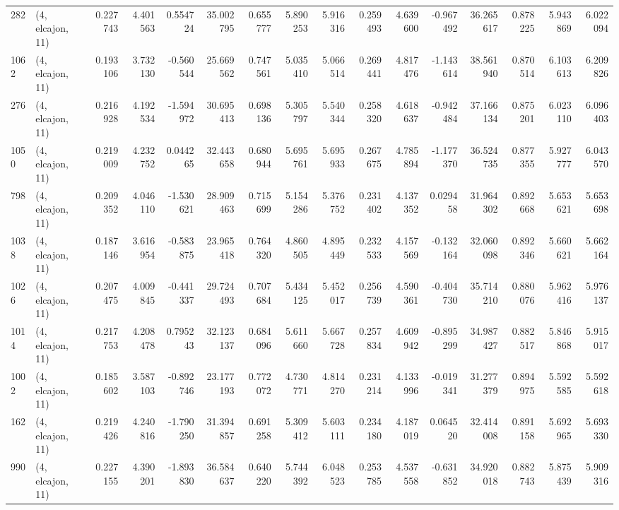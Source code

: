 \begin{tabular}{llrrrrrrrrrrrrrr}
282  &  (4, elcajon, 11) &   0.227743 &   4.401563 &   0.554724 &     35.002795 &    0.655777 &    5.890253 &    5.916316 &  0.259493 &   4.639600 &  -0.967492 &    36.265617 &   0.878225 &   5.943869 &   6.022094 \\
1062 &  (4, elcajon, 11) &   0.193106 &   3.732130 &  -0.560544 &     25.669562 &    0.747561 &    5.035410 &    5.066514 &  0.269441 &   4.817476 &  -1.143614 &    38.561940 &   0.870514 &   6.103613 &   6.209826 \\
276  &  (4, elcajon, 11) &   0.216928 &   4.192534 &  -1.594972 &     30.695413 &    0.698136 &    5.305797 &    5.540344 &  0.258320 &   4.618637 &  -0.942484 &    37.166134 &   0.875201 &   6.023110 &   6.096403 \\
1050 &  (4, elcajon, 11) &   0.219009 &   4.232752 &   0.044265 &     32.443658 &    0.680944 &    5.695761 &    5.695933 &  0.267675 &   4.785894 &  -1.177370 &    36.524735 &   0.877355 &   5.927777 &   6.043570 \\
798  &  (4, elcajon, 11) &   0.209352 &   4.046110 &  -1.530621 &     28.909463 &    0.715699 &    5.154286 &    5.376752 &  0.231402 &   4.137352 &   0.029458 &    31.964302 &   0.892668 &   5.653621 &   5.653698 \\
1038 &  (4, elcajon, 11) &   0.187146 &   3.616954 &  -0.583875 &     23.965418 &    0.764320 &    4.860505 &    4.895449 &  0.232533 &   4.157569 &  -0.132164 &    32.060098 &   0.892346 &   5.660621 &   5.662164 \\
1026 &  (4, elcajon, 11) &   0.207475 &   4.009845 &  -0.441337 &     29.724493 &    0.707684 &    5.434125 &    5.452017 &  0.256739 &   4.590361 &  -0.404730 &    35.714210 &   0.880076 &   5.962416 &   5.976137 \\
1014 &  (4, elcajon, 11) &   0.217753 &   4.208478 &   0.795243 &     32.123137 &    0.684096 &    5.611660 &    5.667728 &  0.257834 &   4.609942 &  -0.895299 &    34.987427 &   0.882517 &   5.846868 &   5.915017 \\
1002 &  (4, elcajon, 11) &   0.185602 &   3.587103 &  -0.892746 &     23.177193 &    0.772072 &    4.730771 &    4.814270 &  0.231214 &   4.133996 &  -0.019341 &    31.277379 &   0.894975 &   5.592585 &   5.592618 \\
162  &  (4, elcajon, 11) &   0.219426 &   4.240816 &  -1.790250 &     31.394857 &    0.691258 &    5.309412 &    5.603111 &  0.234180 &   4.187019 &   0.064520 &    32.414008 &   0.891158 &   5.692965 &   5.693330 \\
990  &  (4, elcajon, 11) &   0.227155 &   4.390201 &  -1.893830 &     36.584637 &    0.640220 &    5.744392 &    6.048523 &  0.253785 &   4.537558 &  -0.631852 &    34.920018 &   0.882743 &   5.875439 &   5.909316 \\

\end{tabular}
